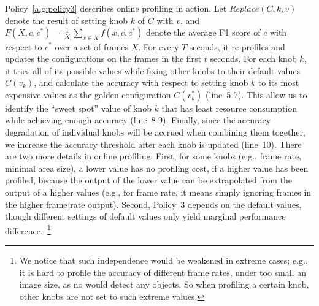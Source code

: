 Policy~\ref{alg:policy3} describes online profiling in action. 
Let $Replace(C,k,v)$ denote the result of setting knob $k$
of $C$ with $v$, and $F(X,c,c^*)=\frac{1}{|X|}\sum_{x\in X}f(x,c,c^*)$ denote
the average F1 score of $c$ with respect to $c^*$ over a set of frames $X$.
For every $T$ seconds, it re-profiles and updates the configurations
on the frames in the first $t$ seconds.
For each knob $k$, it tries all of its possible values while fixing 
other knobs to their default values $C(v_k)$, and calculate the accuracy 
with respect to setting knob $k$ to its most expensive values as the golden
configuration $C(v_k^*)$ (line~5-7). 
This allow us to identify the ``sweet spot'' value of knob $k$ that has 
least resource consumption while achieving enough accuracy 
(line~8-9).
Finally, since the accuracy degradation of individual knobs will 
be accrued when combining them together, we increase the accuracy 
threshold after each knob is updated (line~10).
There are two more details in online profiling.
First, for some knobs (e.g., frame rate, minimal area size), a lower value
has no profiling cost, if a higher value has been profiled, because the 
output of the lower value can be extrapolated from the output of a higher 
values (e.g., for frame rate, it means simply ignoring frames in the 
higher frame rate output).
Second, Policy~3 depends on the default values, though different settings
of default values only yield marginal performance 
difference.~\footnote{We notice that such independence would be weakened in 
extreme cases; e.g., it is hard to profile the accuracy of different
frame rates, under too small an image size, as no \nn would detect any
objects. So when profiling a certain knob, other knobs are not set to
such extreme values.}




